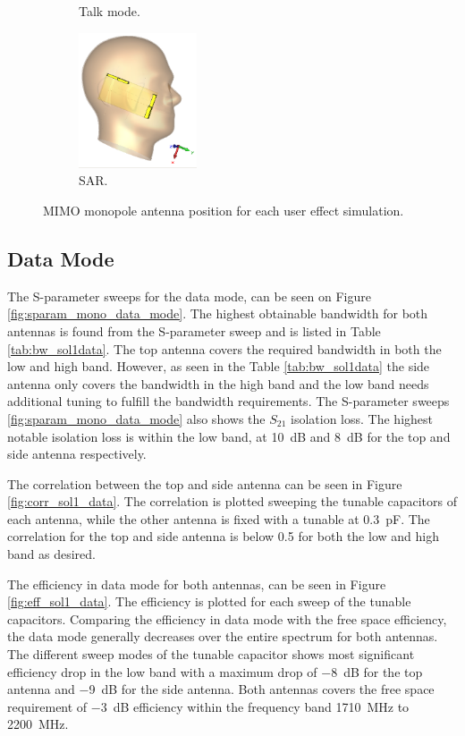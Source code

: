 \begin{figure}[htbp]
\begin{subfigure}[b]{0.24\linewidth}
        \caption{Talk mode.}
    \end{subfigure}
    \begin{subfigure}[b]{0.24\linewidth}
        \centering \includegraphics[width=\linewidth,height=4cm,keepaspectratio]{img/tech_sol/monopole/sar/3d_sar.PNG}
        \caption{SAR.}
    \end{subfigure}
    \caption{MIMO monopole antenna position for each user effect simulation.}
    \label{fig:sol1_monoant_positions}
\end{figure}

\FloatBarrier
\subsection{Data Mode}
The S-parameter sweeps for the data mode, can be seen on Figure \ref{fig:sparam_mono_data_mode}. The highest obtainable bandwidth for both antennas is found from the S-parameter sweep and is listed in Table \ref{tab:bw_sol1data}. The top antenna covers the required bandwidth in both the low and high band. However, as seen in the Table \ref{tab:bw_sol1data} the side antenna only covers the bandwidth in the high band and the low band needs additional tuning to fulfill the bandwidth requirements. The S-parameter sweeps \ref{fig:sparam_mono_data_mode} also shows the $S_{21}$ isolation loss. The highest notable isolation loss is within the low band, at \SI{10}{dB} and \SI{8}{dB} for the top and side antenna respectively.       

The correlation between the top and side antenna can be seen in Figure \ref{fig:corr_sol1_data}. The correlation is plotted sweeping the tunable capacitors of each antenna, while the other antenna is fixed with a tunable at \SI{0.3}{pF}. The correlation for the top and side antenna is below 0.5 for both the low and high band as desired.

The efficiency in data mode for both antennas, can be seen in Figure \ref{fig:eff_sol1_data}. The efficiency is plotted for each sweep of the tunable capacitors. Comparing the efficiency in data mode with the free space efficiency, the data mode generally decreases over the entire spectrum for both antennas. The different sweep modes of the tunable capacitor shows most significant efficiency drop in the low band with a maximum drop of \SI{-8}{dB} for the top antenna and \SI{-9}{dB} for the side antenna. Both antennas covers the free space requirement of \SI{-3}{dB} efficiency within the frequency band \SI{1710}{MHz} to \SI{2200}{MHz}. 

